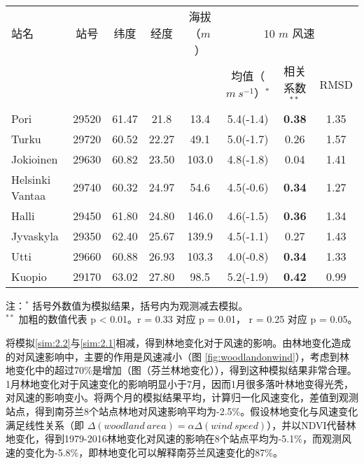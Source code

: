 \begin{table}[!htbp]
    \label{tab:Finlandstationinfo}
    \centering
    \small%
    \setlength{\tabcolsep}{5 pt}%
    \renewcommand{\arraystretch}{1.0}%
    \begin{tabular}{lccccccc}
        \hline
        站名 & 站号 & 纬度 & 经度 & 海拔（$m$）&  \multicolumn{3}{c}{10 $m$ 风速} \\
         & & & & & 均值（$m ~ s^{-1}$）$^*$ &  相关系数 $^ {**}$ & RMSD \\
        \hline
        Pori & 29520 & 61.47 & 21.8 & 13.4 & 5.4(-1.4) & \textbf{0.38} & 1.35 \\
        Turku & 29720 & 60.52 & 22.27 & 49.1 & 5.0(-1.7) & 0.26 & 1.57 \\
        Jokioinen & 29630 & 60.82 & 23.50 & 103.0 & 4.8(-1.8) & 0.04 & 1.41 \\
        Helsinki Vantaa & 29740 & 60.32 & 24.97 & 54.6 & 4.5(-0.6) & \textbf{0.34} & 1.27 \\
        Halli & 29450 & 61.80 & 24.80 & 146.0 & 4.6(-1.5) & \textbf{0.36} & 1.34 \\
        Jyvaskyla & 29350 & 62.40 & 25.67 & 139.9 & 4.5(-1.1) & 0.27 & 1.43 \\
        Utti & 29660 & 60.88 & 26.93 & 103.3 & 4.0(-0.8) & \textbf{0.34} & 1.33 \\
        Kuopio & 29170 & 63.02 & 27.80 & 98.5 & 5.2(-1.9) & \textbf{0.42} & 0.99 \\ 
        \hline
    \end{tabular}
    
     \vspace*{3ex}  
      
    \begin{minipage}{1\textwidth}%
    注：$^*$ 括号外数值为模拟结果，括号内为观测减去模拟。\\ 
    $^{**}$ 加粗的数值代表 p < 0.01。r = 0.33 对应 p = 0.01， r = 0.25 对应 p = 0.05。
    \end{minipage}
\end{table}


将模拟\ref{sim:2.2}与\ref{sim:2.1}相减，得到林地变化对于风速的影响。由林地变化造成的对风速影响中，主要的作用是风速减小（图 \ref{fig:woodlandonwind}），考虑到林地变化中的超过70\%是增加（图（芬兰林地变化）），得到这种模拟结果非常合理。1月林地变化对于风速变化的影响明显小于7月，因而1月很多落叶林地变得光秃，对风速的影响变小。将两个月的模拟结果平均，计算归一化风速变化，差值到观测站点，得到南芬兰8个站点林地对风速影响平均为-2.5\%。假设林地变化与风速变化满足线性关系（即 $\Delta(woodland ~ area) = \alpha \Delta(wind ~ speed)$），并以NDVI代替林地变化，得到1979-2016林地变化对风速的影响在8个站点平均为-5.1\%，而观测风速的变化为-5.8\%，即林地变化可以解释南芬兰风速变化的87\%。

